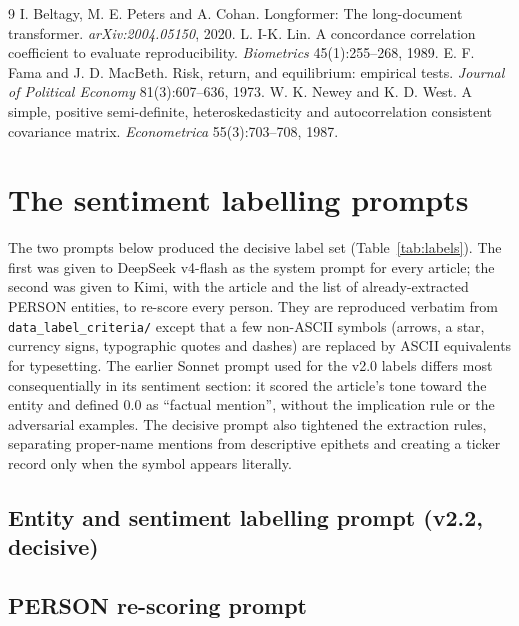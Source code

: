 \documentclass[11pt,letterpaper]{article}
\newcommand{\code}[1]{\texttt{#1}}
\begin{document}

\begin{thebibliography}{9}
 I. Beltagy, M. E. Peters and A. Cohan. Longformer: The
  long-document transformer. \emph{arXiv:2004.05150}, 2020.
 L. I-K. Lin. A concordance correlation coefficient to evaluate
  reproducibility. \emph{Biometrics} 45(1):255--268, 1989.
 E. F. Fama and J. D. MacBeth. Risk, return, and equilibrium: empirical tests.
  \emph{Journal of Political Economy} 81(3):607--636, 1973.
 W. K. Newey and K. D. West. A simple, positive semi-definite,
  heteroskedasticity and autocorrelation consistent covariance matrix. \emph{Econometrica}
  55(3):703--708, 1987.
\end{thebibliography}

\appendix
\section{The sentiment labelling prompts}
\label{app:prompts}

The two prompts below produced the decisive label set (Table~\ref{tab:labels}). The first was
given to DeepSeek v4-flash as the system prompt for every article; the second was given to Kimi,
with the article and the list of already-extracted PERSON entities, to re-score every person. They
are reproduced verbatim from \code{data\_label\_criteria/} except that a few non-ASCII symbols
(arrows, a star, currency signs, typographic quotes and dashes) are replaced by ASCII equivalents
for typesetting. The earlier Sonnet prompt used for the v2.0 labels differs most consequentially
in its sentiment section: it scored the article's tone toward the entity and defined 0.0 as
``factual mention'', without the implication rule or the adversarial examples. The decisive prompt
also tightened the extraction rules, separating proper-name mentions from descriptive epithets
and creating a ticker record only when the symbol appears literally.

\subsection{Entity and sentiment labelling prompt (v2.2, decisive)}


\subsection{PERSON re-scoring prompt}

\end{document}
